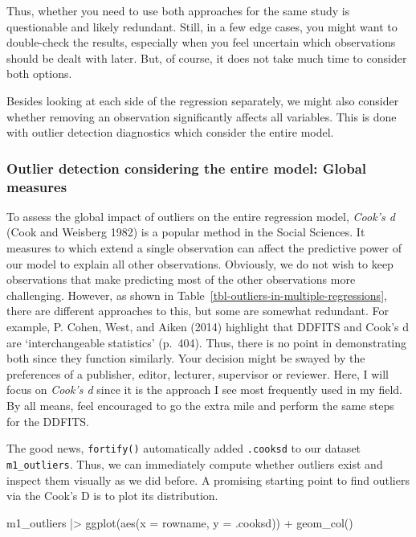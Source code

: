 \documentclass[
  letterpaper,
]{krantz}
\makeatletter
\newenvironment{Shaded}{\begin{snugshade}}{\end{snugshade}}
\newcommand{\AttributeTok}[1]{\textcolor[rgb]{0.40,0.45,0.13}{#1}}
\newcommand{\FunctionTok}[1]{\textcolor[rgb]{0.28,0.35,0.67}{#1}}
\newcommand{\NormalTok}[1]{\textcolor[rgb]{0.00,0.23,0.31}{#1}}
\newcommand{\SpecialCharTok}[1]{\textcolor[rgb]{0.37,0.37,0.37}{#1}}
\newenvironment{kframe}{%
\medskip{}
\setlength{\fboxsep}{.8em}
 \def\at@end@of@kframe{}%
 \ifinner\ifhmode%
  \def\at@end@of@kframe{\end{minipage}}%
  \begin{minipage}{\columnwidth}%
 \fi\fi%
 \def\FrameCommand##1{\hskip\@totalleftmargin \hskip-\fboxsep
 \colorbox{shadecolor}{##1}\hskip-\fboxsep
     \hskip-\linewidth \hskip-\@totalleftmargin \hskip\columnwidth}%
 \MakeFramed {\advance\hsize-\width
   \@totalleftmargin\z@ \linewidth\hsize
   \@setminipage}}%
 {\par\unskip\endMakeFramed%
 \at@end@of@kframe}
\renewenvironment{Shaded}{\begin{kframe}}{\end{kframe}}
\makeatother
\begin{document}
Thus, whether you need to use both approaches for the same study is
questionable and likely redundant. Still, in a few edge cases, you might
want to double-check the results, especially when you feel uncertain
which observations should be dealt with later. But, of course, it does
not take much time to consider both options.

Besides looking at each side of the regression separately, we might also
consider whether removing an observation significantly affects all
variables. This is done with outlier detection diagnostics which
consider the entire model.

\subsubsection{Outlier detection considering the entire model: Global
measures}\label{sec-outlier-detection-global-measures}

To assess the global impact of outliers on the entire regression model,
\emph{Cook's d} (Cook and Weisberg 1982) is a popular method in the
Social Sciences. It measures to which extend a single observation can
affect the predictive power of our model to explain all other
observations. Obviously, we do not wish to keep observations that make
predicting most of the other observations more challenging. However, as
shown in Table~\ref{tbl-outliers-in-multiple-regressions}, there are
different approaches to this, but some are somewhat redundant. For
example, P. Cohen, West, and Aiken (2014) highlight that DDFITS and
Cook's d are `interchangeable statistics' (p.~404). Thus, there is no
point in demonstrating both since they function similarly. Your decision
might be swayed by the preferences of a publisher, editor, lecturer,
supervisor or reviewer. Here, I will focus on \emph{Cook's d} since it
is the approach I see most frequently used in my field. By all means,
feel encouraged to go the extra mile and perform the same steps for the
DDFITS.

The good news, \texttt{fortify()} automatically added \texttt{.cooksd}
to our dataset \texttt{m1\_outliers}. Thus, we can immediately compute
whether outliers exist and inspect them visually as we did before. A
promising starting point to find outliers via the Cook's D is to plot
its distribution.

\begin{Shaded}
\begin{Highlighting}[]
\NormalTok{m1\_outliers }\SpecialCharTok{|\textgreater{}}
  \FunctionTok{ggplot}\NormalTok{(}\FunctionTok{aes}\NormalTok{(}\AttributeTok{x =}\NormalTok{ rowname,}
             \AttributeTok{y =}\NormalTok{ .cooksd)) }\SpecialCharTok{+}
  \FunctionTok{geom\_col}\NormalTok{()}
\end{Highlighting}
\end{Shaded}
\end{document}
